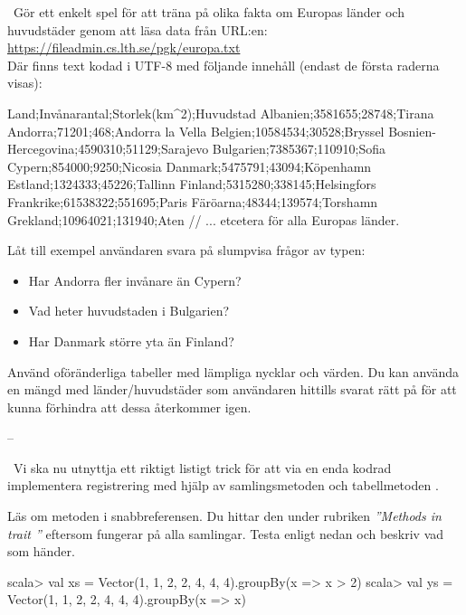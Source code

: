 \Task \what~Gör ett enkelt spel för att träna på olika fakta om Europas länder och huvudstäder genom att läsa data från URL:en:\\ \url{https://fileadmin.cs.lth.se/pgk/europa.txt}
\\Där finns text kodad i UTF-8 med följande innehåll (endast de första raderna visas):
\begin{Code}
Land;Invånarantal;Storlek(km^2);Huvudstad
Albanien;3581655;28748;Tirana
Andorra;71201;468;Andorra la Vella
Belgien;10584534;30528;Bryssel
Bosnien-Hercegovina;4590310;51129;Sarajevo
Bulgarien;7385367;110910;Sofia
Cypern;854000;9250;Nicosia
Danmark;5475791;43094;Köpenhamn
Estland;1324333;45226;Tallinn
Finland;5315280;338145;Helsingfors
Frankrike;61538322;551695;Paris
Färöarna;48344;139574;Torshamn
Grekland;10964021;131940;Aten
// ... etcetera för alla Europas länder.
\end{Code}
Låt till exempel användaren svara på slumpvisa frågor av typen:
\begin{itemize}[noitemsep]
  \item Har Andorra fler invånare än Cypern?
  \item Vad heter huvudstaden i Bulgarien?
  \item Har Danmark större yta än Finland?
\end{itemize}
Använd oföränderliga tabeller med lämpliga nycklar och värden. Du kan använda en mängd med länder/huvudstäder som användaren hittills svarat rätt på för att kunna förhindra att dessa återkommer igen.
\SOLUTION

\TaskSolved --

\QUESTEND



\AdvancedTasks %



\QUESTBEGIN

\Task \what~Vi ska nu utnyttja ett riktigt listigt trick för att via en enda kodrad implementera registrering med hjälp av samlingsmetoden  och tabellmetoden .

\Subtask Läs om metoden  i snabbreferensen. Du hittar den under rubriken \emph{''Methods in trait ''} eftersom  fungerar på alla samlingar. Testa  enligt nedan och beskriv vad som händer.

\begin{REPL}
scala> val xs = Vector(1, 1, 2, 2, 4, 4, 4).groupBy(x => x > 2)
scala> val ys = Vector(1, 1, 2, 2, 4, 4, 4).groupBy(x => x)
\end{REPL}

